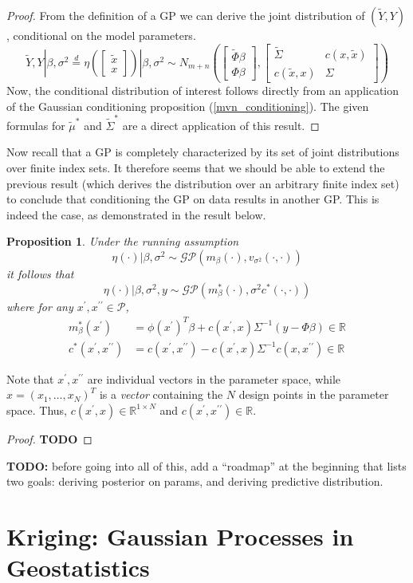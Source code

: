 \documentclass[12pt]{article}
\newcommand{\R}{\mathcal{R}}
\def\R{\mathbb{R}}
\newtheorem{prop}{Proposition}
\begin{document}
\begin{proof}
From the definition of a GP we can derive the joint distribution of $(\tilde{Y}, Y)$, conditional on the model parameters. 
\[\tilde{Y}, Y|\beta, \sigma^2 \overset{d}{=} \eta\left(\begin{bmatrix} \tilde{x} \\ x \end{bmatrix}\right)|\beta, \sigma^2 \sim 
N_{m + n}\left(\begin{bmatrix} \tilde{\Phi}\beta \\ \Phi \beta \end{bmatrix}, \begin{bmatrix} \tilde{\Sigma} & c(x, \tilde{x}) \\ c(\tilde{x}, x) & \Sigma \end{bmatrix} \right)\]
Now, the conditional distribution of interest follows directly from an application of the Gaussian conditioning proposition (\ref{mvn_conditioning}). The given formulas
for $\tilde{\mu}^*$ and $\tilde{\Sigma}^*$ are a direct application of this result. 
\end{proof}

Now recall that a GP is completely characterized by its set of joint distributions over finite index sets. It therefore seems that we should be able to extend the previous 
result (which derives the distribution over an arbitrary finite index set) to conclude that conditioning the GP on data results in another GP. This is indeed the case, as 
demonstrated in the result below. 
\begin{prop}
Under the running assumption 
\[\eta(\cdot)|\beta, \sigma^2 \sim \mathcal{GP}(m_\beta (\cdot), v_{\sigma^2}(\cdot, \cdot)) \]
it follows that 
\[\eta(\cdot)|\beta, \sigma^2, y \sim \mathcal{GP}\left(m^*_\beta(\cdot), \sigma^2 c^*(\cdot, \cdot )\right)\] 
where for any $x^\prime, x^{\prime \prime} \in \mathcal{P}$, 
\begin{align*}
m^*_\beta(x^\prime) &= \phi(x^\prime)^T \beta + c(x^\prime, x) \Sigma^{-1} (y - \Phi \beta) \in \R \\ 
c^*(x^\prime, x^{\prime \prime}) &= c(x^\prime, x^{\prime \prime}) - c(x^\prime, x) \Sigma^{-1} c(x, x^{\prime \prime}) \in \R
\end{align*}
\end{prop}
Note that $x^\prime, x^{\prime \prime}$ are individual vectors in the parameter space, while $x = (x_1, \dots, x_N)^T$ is a \textit{vector} containing the $N$ design 
points in the parameter space. Thus, $c(x^\prime, x) \in \R^{1 \times N}$ and $c(x^\prime, x^{\prime \prime}) \in \R$. 
\begin{proof}
\textbf{TODO}
\end{proof}

\textbf{TODO: } before going into all of this, add a ``roadmap'' at the beginning that lists two goals: deriving posterior on params, and deriving predictive distribution. 

\section{Kriging: Gaussian Processes in Geostatistics}
\end{document}
